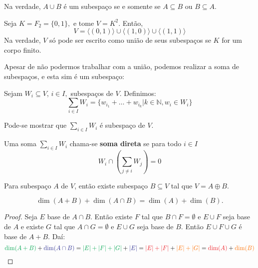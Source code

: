 \documentclass[11pt,twoside,a4paper]{book}
\begin{document}
Na verdade, $A \cup B$ é um subespaço se e somente se $A \subseteq B$ ou $B \subseteq A.$

\begin{observacao}
Seja $K = F_2 = \{ 0, 1 \},$ e tome $V = K^2.$ Então,
\[
V = \langle (0,1) \rangle \cup \langle (1,0) \rangle \cup \langle (1,1) \rangle
\]
Na verdade, $V$ só pode ser escrito como união de seus subespaços se $K$ for um corpo finito.
\end{observacao}

Apesar de não podermos trabalhar com a união, podemos realizar a soma de subespaços, e esta sim é um subespaço:

\begin{definicao}
Sejam $W_i \subseteq V$, $i \in I,$ subespaços de $V.$ Definimos:
\[
\sum\limits_{i \in I} W_i = \{ w_{i_1} + \ldots + w_{i_k} | k \in \mathbb{N}, w_i \in W_i \}
\]
\end{definicao}
Pode-se mostrar que $\sum\limits_{i \in I} W_i $ é subespaço de $V$.
\begin{definicao}
Uma soma $\sum\limits_{i \in I} W_i$ chama-se \textbf{soma direta} se para todo $i \in I$
\[
W_i \cap \left( \sum\limits_{j \neq i} W_j \right) = 0
\]
\end{definicao}
\begin{teorema}
Para subespaço $A$ de $V$, então existe subespaço $B\subseteq V$ tal que $V=A\oplus B$.
\end{teorema}

\begin{teorema}
\[
\dim(A+B)+\dim(A\cap B)=\dim(A)+\dim(B).
\]
\end{teorema}
\begin{proof}
Seja $E$ base de $A\cap B$. Então existe $F$ tal que $B\cap F=\emptyset$ e $E\cup F$ seja base de $A$ e existe $G$ tal que $A\cap G=\emptyset$ e $E\cup G$ seja base de $B$. Então $E\cup F\cup G$ é base de $A+B$. Daí:
\[
\textcolor{Green}{\dim(A+B)} + \textcolor{Blue}{\dim(A \cap B)} = \textcolor{Green}{\abs{E} + \abs{F} + \abs{G}} + \textcolor{Blue}{\abs{E}} = \textcolor{Red}{\abs{E} + \abs{F}} + \textcolor{Laranja}{\abs{E} + \abs{G}} = \textcolor{Red}{\dim(A)} + \textcolor{Laranja}{\dim(B)}
\]
\end{proof}
\end{document}
